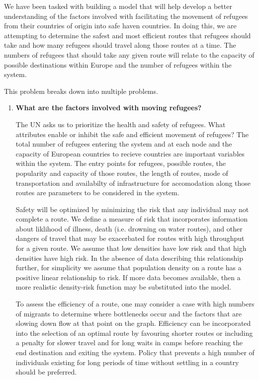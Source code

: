 \documentclass{article}
\begin{document}
We have been tasked with building a model that will help develop a better understanding of the factors involved with facilitating the movement of refugees from their countries of origin into safe haven countries. In doing this, we are attempting to determine the safest and most efficient routes that refugees should take and how many refugees should travel along those routes at a time. The numbers of refugees that should take any given route will relate to the capacity of possible destinations within Europe and the number of refugees within the system. 


This problem breaks down into multiple problems.

\begin{enumerate}
    \item {\bf What are the factors involved with moving refugees?}

    The UN asks us to prioritize the health and safety of refugees. What attributes enable or inhibit the safe and efficient movement of refugees? The total number of refugees entering the system and at each node and the capacity of European countries to recieve countries are important variables within the system. The entry points for refugees, possible routes, the popularity and capacity of those routes, the length of routes, mode of transportation and availabilty of infrastructure for accomodation along those routes are parameters to be considered in the system.

    Safety will be optimized by minimizing the risk that any individual may not complete a route. We define a measure of risk that incorporates information about liklihood of illness, death (i.e. drowning on water routes), and other dangers of travel that may be exacerbated for routes with high throughput for a given route. We assume that low densities have low risk and that high densities have high risk. In the absence of data describing this relationship further, for simplicity we assume that population density on a route has a positive linear relationship to risk. If more data becomes available, then a more realistic density-risk function may be substituted into the model.

    To assess the efficiency of a route, one may consider a case with high numbers of migrants to determine where bottlenecks occur and the factors that are slowing down flow at that point on the graph. Efficiency can be incorporated into the selection of an optimal route by favouring shorter routes or including a penalty for slower travel and for long waits in camps before reaching the end destination and exiting the system. Policy that prevents a high number of individuals existing for long periods of time without settling in a country should be preferred.


\end{enumerate}
\end{document}
